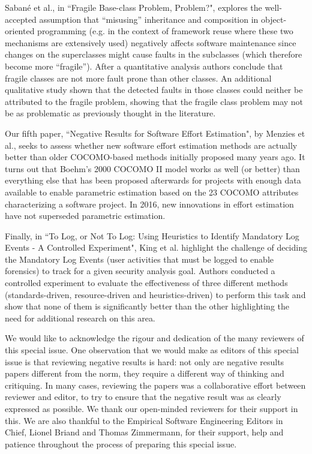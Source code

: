 \documentclass{svjour3}                     %
\begin{document}
Sabané et al., in ``Fragile Base-class Problem, Problem?", explores the well-accepted assumption that ``misusing'' inheritance and composition in object-oriented programming (e.g. in the context of framework reuse where these two mechanisms are extensively used) negatively affects software maintenance since changes on the superclasses might cause faults in the subclasses (which therefore become more ``fragile''). After a quantitative analysis authors conclude that fragile classes are not more fault prone than other classes. An additional qualitative study shown that the detected faults in those classes could neither be attributed to the fragile problem, showing that the fragile class problem may not be as problematic as previously thought in the literature.

Our fifth paper, ``Negative Results for Software Effort Estimation", by Menzies et al., seeks to assess whether new software effort estimation methods are actually better than older COCOMO-based methods initially proposed many years ago. It turns out that Boehm’s 2000 COCOMO II model works as well (or better) than everything else that has been proposed afterwards for projects with enough data available to enable parametric estimation based on the 23 COCOMO attributes characterizing a software project. In 2016, new innovations in effort estimation have not superseded parametric estimation.

Finally, in ``To Log, or Not To Log: Using Heuristics to Identify Mandatory Log Events - A Controlled Experiment", King et al. highlight the challenge of deciding the Mandatory Log Events  (user activities that must be logged to enable forensics) to track for a given security analysis goal. Authors conducted a controlled experiment to evaluate the effectiveness of three different methods (standards-driven, resource-driven and heuristics-driven) to perform this task and show that none of them is significantly better than the other highlighting the need for additional research on this area.

We would like to acknowledge the rigour and dedication of the many reviewers of this special issue. One observation that we would make as editors of this special issue is that reviewing negative results is hard: not only are negative results papers different from the norm, they require a different way of thinking and critiquing. In many cases, reviewing the papers was a collaborative effort between reviewer and editor, to try to ensure that the negative result was as clearly expressed as possible. We thank our open-minded reviewers for their support in this. We are also thankful to the Empirical Software Engineering Editors in Chief, Lionel Briand and Thomas Zimmermann, for their support, help and patience throughout the process of preparing this special issue.
\end{document}
